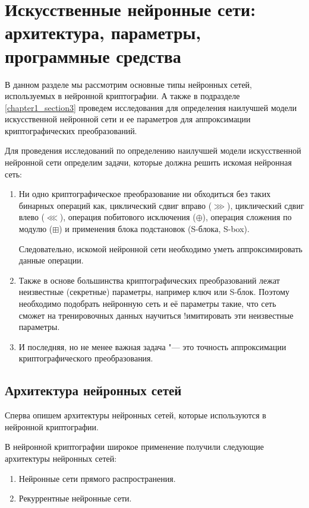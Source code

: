 \newpage
\section{Искусственные нейронные сети: архитектура, параметры, программные средства}
В данном разделе мы рассмотрим основные типы нейронных сетей, используемых в нейронной криптографии. А также в подразделе \ref{chapter1_section3} проведем исследования для определения наилучшей модели искусственной нейронной сети и ее параметров для аппроксимации криптографических преобразований.
\bigskip

Для проведения исследований по определению наилучшей модели искусственной нейронной сети определим задачи, которые должна решить искомая нейронная сеть:
\begin{enumerate}
	\item Ни одно криптографическое преобразование ни обходиться без таких бинарных операций как, циклический сдвиг вправо ($\ggg$), циклический сдвиг влево ($\lll$),
	операция побитового исключения ($\oplus$), операция сложения по модулю ($\boxplus$) и применения блока подстановок (S-блока, S-box).
	
	Следовательно, искомой нейронной сети необходимо уметь аппроксимировать данные операции.
	
	\item Также в основе большинства криптографических преобразований лежат неизвестные (секретные) параметры, например ключ или S-блок.
	Поэтому необходимо подобрать нейронную сеть и её параметры такие, что сеть сможет на тренировочных данных научиться !имитировать эти неизвестные параметры.
	
	\item И последняя, но не менее важная задача "--- это точность аппроксимации криптографического преобразования.
\end{enumerate}
\bigskip

\subsection{Архитектура нейронных сетей}
Сперва опишем архитектуры нейронных сетей, которые используются в нейронной криптографии.
\bigskip

В нейронной криптографии широкое применение получили следующие архитектуры нейронных сетей:
\begin{enumerate}
	\item Нейронные сети прямого распространения.
	\item Рекуррентные нейронные сети.
\end{enumerate}

